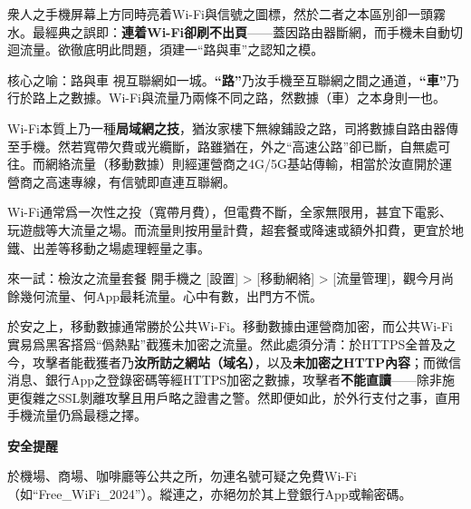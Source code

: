 


衆人之手機屏幕上方同時亮着Wi-Fi與信號之圖標，然於二者之本區別卻一頭霧水。最經典之誤即：\textbf{連着Wi-Fi卻刷不出頁}——蓋因路由器斷網，而手機未自動切迴流量。欲徹底明此問題，須建一“路與車”之認知之模。

\begin{tcbinfo}{核心之喻：路與車}
視互聯網如一城。\textbf{“路”}乃汝手機至互聯網之間之通道，\textbf{“車”}乃行於路上之數據。Wi-Fi與流量乃兩條不同之路，然數據（車）之本身則一也。

\end{tcbinfo}


Wi-Fi本質上乃一種\textbf{局域網之技}，猶汝家樓下無線鋪設之路，司將數據自路由器傳至手機。然若寬帶欠費或光纜斷，路雖猶在，外之“高速公路”卻已斷，自無處可往。而網絡流量（移動數據）則經運營商之4G/5G基站傳輸，相當於汝直開於運營商之高速專線，有信號即直連互聯網。


Wi-Fi通常爲一次性之投（寬帶月費），但電費不斷，全家無限用，甚宜下電影、玩遊戲等大流量之場。而流量則按用量計費，超套餐或降速或額外扣費，更宜於地鐵、出差等移動之場處理輕量之事。

\begin{tcbpractice}{來一試：檢汝之流量套餐}
開手機之 [設置] > [移動網絡] > [流量管理]，觀今月尚餘幾何流量、何App最耗流量。心中有數，出門方不慌。

\end{tcbpractice}


於安之上，移動數據通常勝於公共Wi-Fi。移動數據由運營商加密，而公共Wi-Fi實易爲黑客搭爲“僞熱點”截獲未加密之流量。然此處須分清：於HTTPS全普及之今，攻擊者能截獲者乃\textbf{汝所訪之網站（域名）}，以及\textbf{未加密之HTTP內容}；而微信消息、銀行App之登錄密碼等經HTTPS加密之數據，攻擊者\textbf{不能直讀}——除非施更復雜之SSL剝離攻擊且用戶略之證書之警。然即便如此，於外行支付之事，直用手機流量仍爲最穩之擇。

\textbf{安全提醒}\par

於機場、商場、咖啡廳等公共之所，勿連名號可疑之免費Wi-Fi（如“Free\_WiFi\_2024”）。縱連之，亦絕勿於其上登銀行App或輸密碼。

